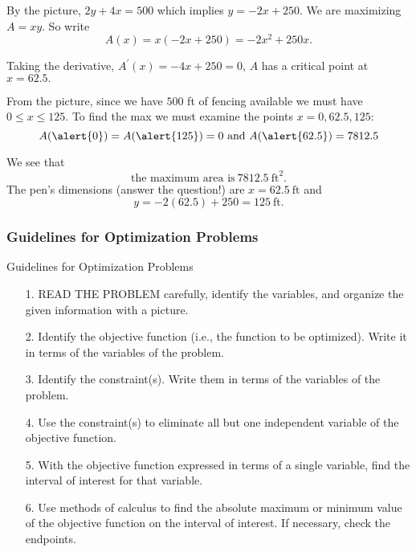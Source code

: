 \documentclass[cal1spr16Lectures.tex]{subfiles}
\begin{document}
\begin{frame}
\small
By the picture, $2y+4x=500$ which implies $y=-2x+250$.  We are maximizing $A=xy$.  So write
\[A(x)=x(-2x+250)=-2x^2+250x.\]

Taking the derivative, $A^{\prime}(x)=-4x+250=0$, $A$ has a critical point at $x=62.5.$
\end{frame}

\begin{frame}
\footnotesize
From the picture, since we have $500$ ft of fencing available we must have $0 \le x \le 125$.  To find the max we must examine the points $x=0,62.5,125$:
\[A(\alert{0})=A(\alert{125})=0\text{ and }A(\alert{62.5})=7812.5\]

\vspace{1pc}
We see that 
\[\boxed{\text{the maximum area is}\ 7812.5\ \text{ft}^2.}\]
The pen's dimensions (answer the question!) are $\boxed{x=62.5\ \text{ft}}$ and 
\[\boxed{y=-2(62.5)+250=125\ \text{ft}.}\]
\end{frame}

\subsubsection{Guidelines for Optimization Problems}

\begin{frame}{\small Guidelines for Optimization Problems}
\footnotesize
\begin{itemize}
\item[1.] \alert{READ THE PROBLEM} carefully, identify the variables, and organize the given information with a picture.
\item[2.] Identify the objective function (i.e., the function to be optimized).  Write it in terms of the variables of the problem.
\item[3.] Identify the constraint(s).  Write them in terms of the variables of the problem.
\item[4.] Use the constraint(s) to eliminate all but one independent variable of the objective function.  
\item[5.] With the objective function expressed in terms of a single variable, find the interval of interest for that variable.
\item[6.] Use methods of calculus to find the absolute maximum or minimum value of the objective function on the interval of interest.  If necessary, \alert{check the endpoints}.
\end{itemize}
\end{frame}
\end{document}
